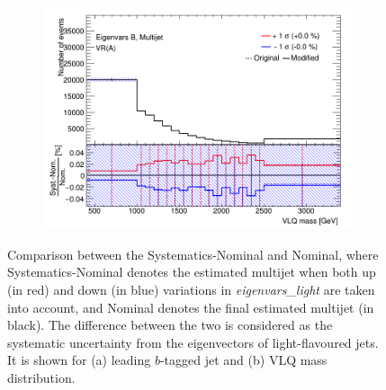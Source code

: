 \begin{itemize}
\begin{figure}[hbt!]
		\begin{subfigure}{.35\textwidth}
			\centering
			\includegraphics[width=\linewidth,height=\textheight,keepaspectratio]{VR_B_VLQM_Multijets.png}
			\caption{}
			\label{fig:uncertainties:systematics:btagging:light:vlqm}
		\end{subfigure}
		\caption{Comparison between the Systematics-Nominal and Nominal, where Systematics-Nominal denotes the estimated multijet when both up (in red) and down (in blue) variations in \textit{eigenvars\_light} are taken into account, and Nominal denotes the final estimated multijet (in black). The difference between the two is considered as the systematic uncertainty from the eigenvectors of light-flavoured jets. It is shown for (a) leading $b$-tagged jet \pt and (b) VLQ mass distribution.}
		\label{fig:uncertainties:systematics:btagging:light}
	\end{figure}


\end{itemize}

